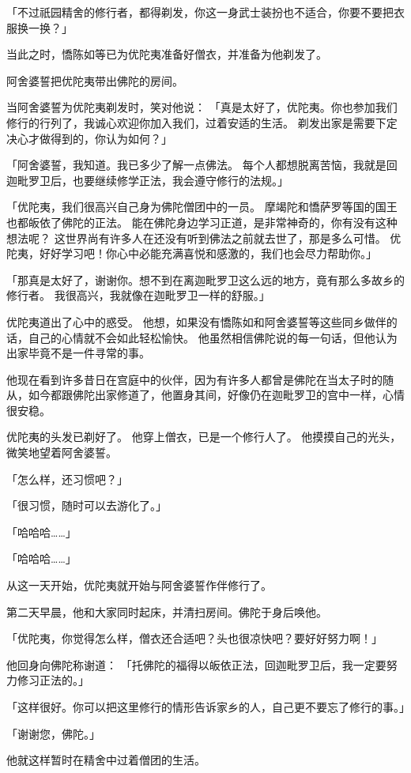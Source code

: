 \documentclass[twoside,openany]{book}
\begin{document}
「不过祇园精舍的修行者，都得剃发，你这一身武士装扮也不适合，你要不要把衣服换一换？」

当此之时，憍陈如等已为优陀夷准备好僧衣，并准备为他剃发了。

阿舍婆誓把优陀夷带出佛陀的房间。

当阿舍婆誓为优陀夷剃发时，笑对他说：
「真是太好了，优陀夷。你也参加我们修行的行列了，我诚心欢迎你加入我们，过着安适的生活。
剃发出家是需要下定决心才做得到的，你认为如何？」

「阿舍婆誓，我知道。我已多少了解一点佛法。
每个人都想脱离苦恼，我就是回迦毗罗卫后，也要继续修学正法，我会遵守修行的法规。」

「优陀夷，我们很高兴自己身为佛陀僧团中的一员。
摩竭陀和憍萨罗等国的国王也都皈依了佛陀的正法。
能在佛陀身边学习正道，是非常神奇的，你有没有这种想法呢？
这世界尚有许多人在还没有听到佛法之前就去世了，那是多么可惜。
优陀夷，好好学习吧！你心中必能充满喜悦和感激的，我们也会尽力帮助你。」

「那真是太好了，谢谢你。想不到在离迦毗罗卫这么远的地方，竟有那么多故乡的修行者。
我很高兴，我就像在迦毗罗卫一样的舒服。」

优陀夷道出了心中的惑受。
他想，如果没有憍陈如和阿舍婆誓等这些同乡做伴的话，自己的心情就不会如此轻松愉快。
他虽然相信佛陀说的每一句话，但他认为出家毕竟不是一件寻常的事。

他现在看到许多昔日在宫庭中的伙伴，因为有许多人都曾是佛陀在当太子时的随从，如今都跟佛陀出家修道了，他置身其间，好像仍在迦毗罗卫的宫中一样，心情很安稳。

优陀夷的头发已剃好了。
他穿上僧衣，已是一个修行人了。
他摸摸自己的光头，微笑地望着阿舍婆誓。

「怎么样，还习惯吧？」

「很习惯，随时可以去游化了。」

「哈哈哈……」

「哈哈哈……」

从这一天开始，优陀夷就开始与阿舍婆誓作伴修行了。

第二天早晨，他和大家同时起床，并清扫房间。佛陀于身后唤他。

「优陀夷，你觉得怎么样，僧衣还合适吧？头也很凉快吧？要好好努力啊！」

他回身向佛陀称谢道：
「托佛陀的福得以皈依正法，回迦毗罗卫后，我一定要努力修习正法的。」

「这样很好。你可以把这里修行的情形告诉家乡的人，自己更不要忘了修行的事。」

「谢谢您，佛陀。」

他就这样暂时在精舍中过着僧团的生活。
\end{document}
